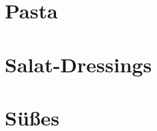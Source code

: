 \documentclass[
  DIV=11,%
  pagesize,%
  fontsize=11pt,%
  paper=a4,%
  numbers=noenddot,
]{scrartcl}
\begin{document}
\section{Pasta}
\newpage
\newpage

\section{Salat-Dressings}
\newpage

\section{Süßes}
\newpage
\newpage
\newpage
\end{document}
